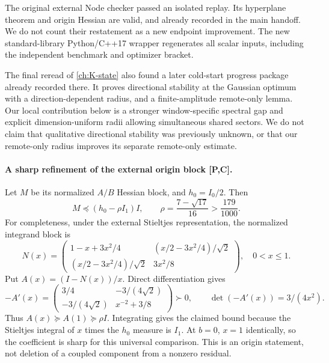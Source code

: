 The original external Node checker passed an isolated replay. Its hyperplane
theorem and origin Hessian are valid, and already recorded in the main
handoff. We do not count their restatement as a new endpoint improvement.
The new standard-library Python/C++17 wrapper regenerates all scalar inputs,
including the independent benchmark and optimizer bracket.

The final reread of \autoref{ch:K-state} also found a later cold-start progress package
already recorded there. It proves directional stability at the Gaussian
optimum with a direction-dependent radius, and a finite-amplitude remote-only
lemma. Our local contribution below is a stronger window-specific spectral
gap and explicit dimension-uniform radii allowing simultaneous shared sectors.
We do not claim that qualitative directional stability was previously unknown,
or that our remote-only radius improves its separate remote-only estimate.

\paragraph{A sharp refinement of the external origin block [P,C].}
Let $M$ be its normalized $A/B$ Hessian block, and $h_0=I_0/2$.
Then
\[
 M\preceq\left(h_0-\rho I_1\right)I,
 \qquad \rho=\frac{7-\sqrt{17}}{16}>\frac{179}{1000}.
\]
For completeness, under the external Stieltjes representation, the normalized
integrand block is
\[
 N(x)=\begin{pmatrix}
 1-x+3x^2/4&(x/2-3x^2/4)/\sqrt2\\
 (x/2-3x^2/4)/\sqrt2&3x^2/8
 \end{pmatrix},\quad 0<x\le1.
\]
Put $A(x)=(I-N(x))/x$. Direct differentiation gives
\[
 -A'(x)=\begin{pmatrix}3/4&-3/(4\sqrt2)\\
 -3/(4\sqrt2)&x^{-2}+3/8\end{pmatrix}\succ0,
 \qquad\det(-A'(x))=3/(4x^2).
\]
Thus $A(x)\succeq A(1)\succeq\rho I$. Integrating gives the claimed
bound because the Stieltjes integral of $x$ times the $h_0$ measure is $I_1$.
At $b=0$, $x=1$ identically, so the coefficient is sharp for this universal
comparison. This is an origin statement, not deletion of a coupled component
from a nonzero residual.

